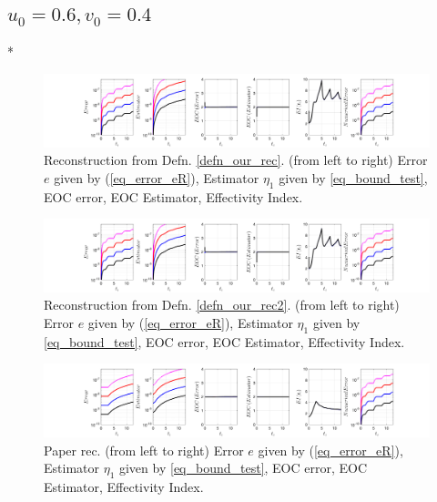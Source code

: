 \documentclass[12pt,a4paper]{article}
\numberwithin{equation}{section}
\theoremstyle{definition}
\begin{document}
\subsection*{$u_0=0.6, v_0= 0.4$}
\/*
\begin{figure}[H]
	\hspace{-3cm}
	\includegraphics[scale=0.55]{fig_LeapFrogplots_1x5_sin_IC_harmonic_order_2_u6_v4_rec_george}	
	\caption{Reconstruction from Defn. \ref{defn_our_rec}. (from left to right) Error $e$ given by (\ref{eq_error_eR}), Estimator $\eta_1$ given by \ref{eq_bound_test}, EOC error, EOC Estimator, Effectivity Index.}
	\label{fig_all_in_one_our_rec_george_u6_v4}
\end{figure}
\begin{figure}[H]
	\hspace{-3cm}
	\includegraphics[scale=0.55]{fig_LeapFrogplots_1x5_sin_IC_harmonic_order_2_u6_v4_rec2}	
	\caption{Reconstruction from Defn. \ref{defn_our_rec2}. (from left to right) Error $e$ given by (\ref{eq_error_eR}), Estimator $\eta_1$ given by \ref{eq_bound_test},  EOC error, EOC Estimator, Effectivity Index.}
	\label{fig_all_in_one_our_rec_2_u6_v4}
\end{figure}
\begin{figure}[H]
	\hspace{-3cm}
	\includegraphics[scale=0.55]{fig_LeapFrogplots_1x5_sin_IC_harmonic_u6_v4_paperrec}	
	\caption{Paper rec. (from left to right) Error $e$ given by (\ref{eq_error_eR}), Estimator $\eta_1$ given by \ref{eq_bound_test},  EOC error, EOC Estimator, Effectivity Index.}
	\label{fig_all_in_one_paperrec_u06_v04}
\end{figure}
\end{document}
